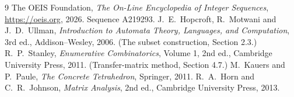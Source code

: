 \documentclass[11pt,a4paper]{article}
\theoremstyle{plain}
\theoremstyle{definition}
\begin{document}
\begin{thebibliography}{9}
 The OEIS Foundation, \emph{The On-Line Encyclopedia of Integer
Sequences}, \url{https://oeis.org}, 2026. Sequence A219293.
 J.~E.~Hopcroft, R.~Motwani and J.~D.~Ullman, \emph{Introduction to Automata
Theory, Languages, and Computation}, 3rd ed., Addison--Wesley, 2006. (The subset
construction, Section 2.3.)
 R.~P.~Stanley, \emph{Enumerative Combinatorics}, Volume 1, 2nd ed.,
Cambridge University Press, 2011. (Transfer-matrix method, Section 4.7.)
 M.~Kauers and P.~Paule, \emph{The Concrete Tetrahedron}, Springer, 2011.
 R.~A.~Horn and C.~R.~Johnson, \emph{Matrix Analysis}, 2nd ed., Cambridge
University Press, 2013.
\end{thebibliography}
\end{document}

